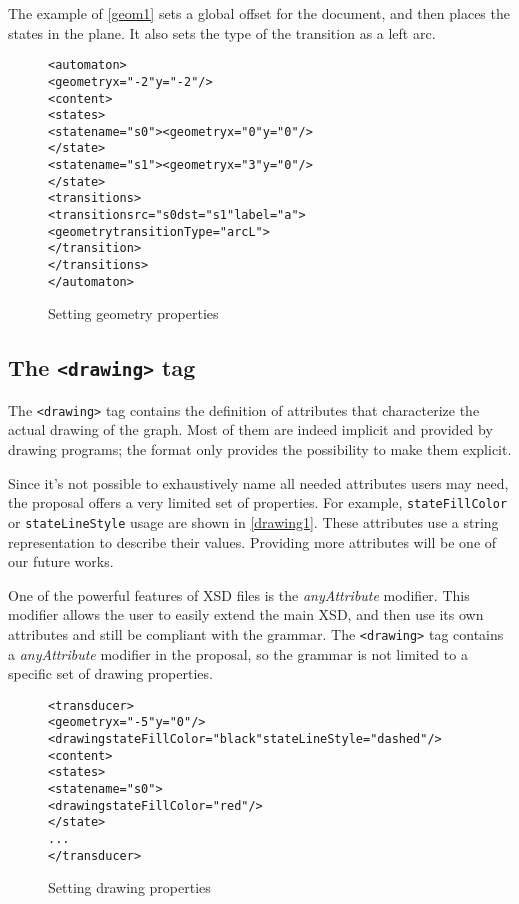 \documentclass[a4paper]{article}
\newcommand{\xtag}[1]{\texttt{<#1>}}
\newcommand{\xattr}[1]{\texttt{#1}}
\begin{document}
The example of \autoref{geom1} sets a global offset for the document,
and then places the states in the plane.  It also sets the type of the
transition as a left arc.

\begin{figure}[htp]
  \small
  \begin{center}
\begin{alltt}
<automaton>
  <geometry x="-2" y="-2"/>
  <content>
     <states>
        <state name="s0"><geometry x="0" y="0"/>
        </state>
        <state name="s1"><geometry x="3" y="0"/>
        </state>
     <transitions>
        <transition src="s0 dst="s1" label="a">
          <geometry transitionType="arcL">
        </transition>
     </transitions>
</automaton>
\end{alltt}

\caption{Setting geometry properties}
\label{geom1}
  \end{center}
\end{figure}


\subsection{The \xtag{drawing} tag}

The \xtag{drawing} tag contains the definition of attributes that
characterize the actual drawing of the graph.  Most of them are indeed
implicit and provided by drawing programs; the format only provides
the possibility to make them explicit.

Since it's not possible to exhaustively name all needed attributes
users may need, the proposal offers a very limited set of properties. For
example, \xattr{stateFillColor} or \xattr{stateLineStyle} usage are
shown in \autoref{drawing1}. These attributes use a string representation to
describe their values. Providing more attributes will be one of our future
works.

One of the powerful features of XSD files is the \textit{anyAttribute}
modifier. This modifier allows the user to easily extend the main XSD,
and then use its own attributes and still be compliant with the
grammar. The \xtag{drawing} tag contains a \textit{anyAttribute}
modifier in the proposal, so the grammar is not limited to a specific
set of drawing properties.

\begin{figure}[ht]
  \small
  \begin{center}
\begin{alltt}
<transducer>
  <geometry x="-5" y="0"/>
  <drawing stateFillColor="black" stateLineStyle="dashed"/>
  <content>
     <states>
        <state name="s0">
            <drawing stateFillColor="red"/>
        </state>
      ...
</transducer>
\end{alltt}

\caption{Setting drawing properties}
\label{drawing1}
  \end{center}
\end{figure}
\end{document}

